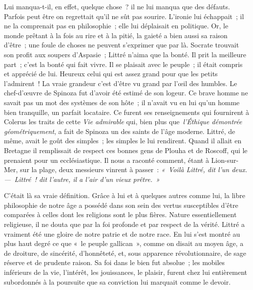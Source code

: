 \documentclass[french,twoside]{book} %
\newcommand\orgName[1]{#1}
\newcommand\persName[1]{#1}
\newcommand\placeName[1]{#1}
\begin{document}
Lui manqua-t-il, en effet, quelque chose ? il ne lui manqua que des défauts. Parfois peut être on regrettait qu’il ne sût pas sourire. L’ironie lui échappait ; il ne la comprenait pas en philosophie ; elle lui déplaisait en politique. Or, le monde prêtant à la fois au rire et à la pitié, la gaieté a bien aussi sa raison d’être ; une foule de choses ne peuvent s’exprimer que par là. {\persName Socrate} trouvait son profit aux soupers d’{\persName Aspasie} ; {\persName Littré} n’aima que la bonté. Il prit la meilleure part ; c’est la bonté qui fait vivre. Il se plaisait avec le peuple ; il était compris et apprécié de lui. Heureux celui qui est assez grand pour que les petits l’admirent ! La vraie grandeur c’est d’être vu grand par l’œil des humbles. Le chef-d’œuvre de {\persName Spinoza} fut d’avoir été estimé de son logeur. Ce brave homme ne savait pas un mot des systèmes de son hôte ; il n’avait vu en lui qu’un homme bien tranquille, un parfait locataire. Ce furent ses renseignements qui fournirent à {\persName Colerus} les traits de cette \emph{Vie admirable} qui, bien plus que \emph{l’Éthique démontrée géométriquement}, a fait de {\persName Spinoza} un des saints de l’âge moderne. {\persName Littré}, de même, avait le goût des simples ; les simples le lui rendirent. Quand il allait en {\placeName Bretagne} il remplissait de respect ces bonnes gens de {\placeName Plouha} et de {\placeName Roscoff}, qui le prenaient pour un ecclésiastique. Il nous a raconté comment, étant à {\placeName Lion-sur-Mer}, sur la plage, deux messieurs vinrent à passer : \emph{« Voilà {\persName Littré}, dit l’un deux. — {\persName Littré} ! dit l’autre, il a l’air d’un vieux prêtre. »}\par
C’était là sa vraie définition. Grâce à lui et à quelques autres comme lui, la libre philosophie de notre âge a possédé dans son sein des vertus susceptibles d’être comparées à celles dont les religions sont le plus fières. Nature essentiellement religieuse, il ne douta que par la foi profonde et par respect de la vérité. {\persName Littré} a vraiment été une gloire de notre patrie et de notre race. En lui s’est montré au plus haut degré ce que « le {\orgName peuple gallican} », comme on disait au moyen âge, a de droiture, de sincérité, d’honnêteté, et, sous apparence révolutionnaire, de sage réserve et de prudente raison. Sa foi dans le bien fut absolue ; les mobiles inférieurs de la vie, l’intérêt, les jouissances, le plaisir, furent chez lui entièrement subordonnés à la poursuite que sa conviction lui marquait comme le devoir.\par
\end{document}
